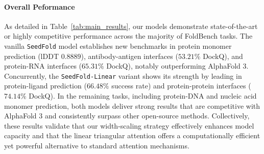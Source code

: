 

\paragraph{Overall Peformance} As detailed in Table~\ref{tab:main_results}, our models demonstrate state-of-the-art or highly competitive performance across the majority of FoldBench tasks. The vanilla \texttt{SeedFold} model establishes new benchmarks in protein monomer prediction (lDDT $0.8889$), antibody-antigen interfaces ($53.21\%$ DockQ), and protein-RNA interfaces ($65.31\%$ DockQ), notably outperforming AlphaFold 3. Concurrently, the \texttt{SeedFold-Linear} variant shows its strength by leading in protein-ligand prediction ($66.48\%$ success rate) and protein-protein interfaces ($74.14\%$ DockQ). In the remaining tasks, including protein-DNA and nucleic acid monomer prediction, both models deliver strong results that are competitive with AlphaFold 3 and consistently surpass other open-source methods. Collectively, these results validate that our width-scaling strategy effectively enhances model capacity and that the linear triangular attention offers a computationally efficient yet powerful alternative to standard attention mechanisms.


